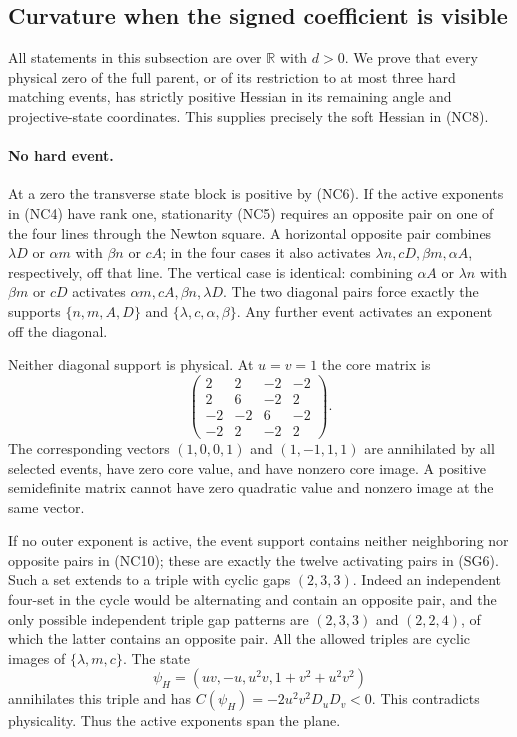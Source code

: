 \subsection{Curvature when the signed coefficient is visible}

All statements in this subsection are over $\mathbb R$ with $d>0$.
We prove that every physical zero of the full parent, or of its
restriction to at most three hard matching events, has strictly
positive Hessian in its remaining angle and projective-state
coordinates. This supplies precisely the soft Hessian in (NC8).

\paragraph{No hard event.}
At a zero the transverse state block is positive by (NC6). If the
active exponents in (NC4) have rank one, stationarity (NC5) requires
an opposite pair on one of the four lines through the Newton square.
A horizontal opposite pair combines $\lambda D$ or $\alpha m$
with $\beta n$ or $cA$; in the four cases it also activates
$\lambda n,cD,\beta m,\alpha A$, respectively, off that line.
The vertical case is identical: combining $\alpha A$ or $\lambda n$
with $\beta m$ or $cD$ activates $\alpha m,cA,\beta n,\lambda D$.
The two diagonal pairs force exactly the supports
$\{n,m,A,D\}$ and $\{\lambda,c,\alpha,\beta\}$.
Any further event activates an exponent off the diagonal.

Neither diagonal support is physical. At $u=v=1$ the core matrix is
\[
 \begin{pmatrix}
 2&2&-2&-2\\2&6&-2&2\\-2&-2&6&-2\\-2&2&-2&2
 \end{pmatrix}.                                      \tag{NC12}
\]
The corresponding vectors $(1,0,0,1)$ and $(1,-1,1,1)$ are
annihilated by all selected events, have zero core value, and have
nonzero core image. A positive semidefinite matrix cannot have zero
quadratic value and nonzero image at the same vector.

If no outer exponent is active, the event support contains neither
neighboring nor opposite pairs in (NC10); these are exactly the
twelve activating pairs in (SG6). Such a set extends to a triple
with cyclic gaps $(2,3,3)$. Indeed an independent four-set in the
cycle would be alternating and contain an opposite pair, and the
only possible independent triple gap patterns are $(2,3,3)$ and
$(2,2,4)$, of which the latter contains an opposite pair. All the
allowed triples are cyclic images of $\{\lambda,m,c\}$.
The state
\[
 \psi_H=(uv,-u,u^2v,1+v^2+u^2v^2)
\]
annihilates this triple and has
$C(\psi_H)=-2u^2v^2D_uD_v<0$. This contradicts physicality.
Thus the active exponents span the plane.

